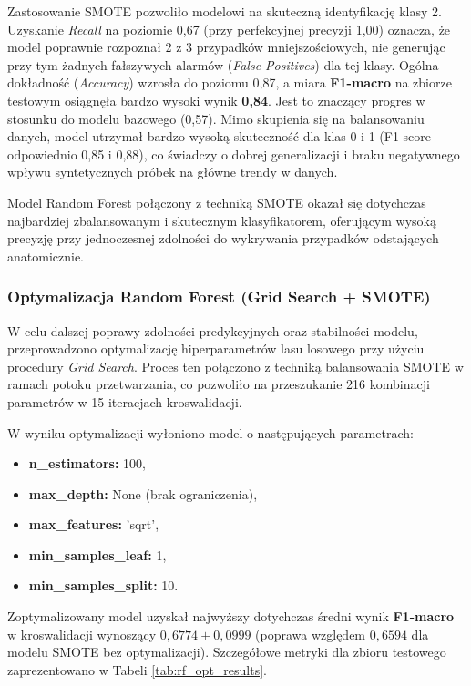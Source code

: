 \documentclass[12pt, a4paper]{article}
\begin{document}
Zastosowanie SMOTE pozwoliło modelowi na skuteczną identyfikację klasy 2. Uzyskanie \textit{Recall} na poziomie 0,67 (przy perfekcyjnej precyzji 1,00) oznacza, że model poprawnie rozpoznał 2 z 3 przypadków mniejszościowych, nie generując przy tym żadnych fałszywych alarmów (\textit{False Positives}) dla tej klasy. Ogólna dokładność (\textit{Accuracy}) wzrosła do poziomu 0,87, a miara \textbf{F1-macro} na zbiorze testowym osiągnęła bardzo wysoki wynik \textbf{0,84}. Jest to znaczący progres w stosunku do modelu bazowego (0,57). Mimo skupienia się na balansowaniu danych, model utrzymał bardzo wysoką skuteczność dla klas 0 i 1 (F1-score odpowiednio 0,85 i 0,88), co świadczy o dobrej generalizacji i braku negatywnego wpływu syntetycznych próbek na główne trendy w danych.

Model Random Forest połączony z techniką SMOTE okazał się dotychczas najbardziej zbalansowanym i skutecznym klasyfikatorem, oferującym wysoką precyzję przy jednoczesnej zdolności do wykrywania przypadków odstających anatomicznie.



\subsubsection{Optymalizacja Random Forest (Grid Search + SMOTE)}

W celu dalszej poprawy zdolności predykcyjnych oraz stabilności modelu, przeprowadzono optymalizację hiperparametrów lasu losowego przy użyciu procedury \textit{Grid Search}. Proces ten połączono z techniką balansowania SMOTE w ramach potoku przetwarzania, co pozwoliło na przeszukanie 216 kombinacji parametrów w 15 iteracjach kroswalidacji.

W wyniku optymalizacji wyłoniono model o następujących parametrach:
\begin{itemize}
    \item \textbf{n\_estimators:} 100,
    \item \textbf{max\_depth:} None (brak ograniczenia),
    \item \textbf{max\_features:} 'sqrt',
    \item \textbf{min\_samples\_leaf:} 1,
    \item \textbf{min\_samples\_split:} 10.
\end{itemize}

Zoptymalizowany model uzyskał najwyższy dotychczas średni wynik \textbf{F1-macro} w kroswalidacji wynoszący $0{,}6774 \pm 0{,}0999$ (poprawa względem $0{,}6594$ dla modelu SMOTE bez optymalizacji). Szczegółowe metryki dla zbioru testowego zaprezentowano w Tabeli \ref{tab:rf_opt_results}.
\end{document}
